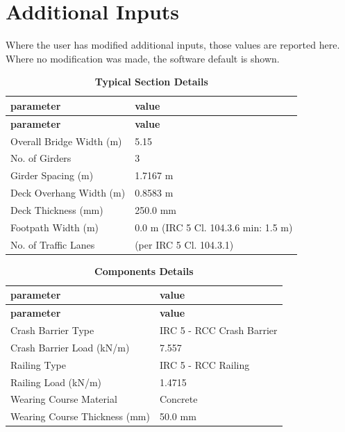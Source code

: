 \documentclass[12pt,a4paper]{report}
\numberwithin{table}{chapter}
\numberwithin{figure}{chapter}
\begin{document}
\newpage
\section{Additional Inputs}
\label{sec:additional-inputs}

Where the user has modified additional inputs, those values are reported here. Where no modification was made, the software default is shown.

\vspace{0.8cm}

\begin{longtable}{|L{5.5cm}|p{10.0cm}|}
\caption{\textbf{Typical Section Details}}
\hline
\textbf{parameter} & \textbf{value} \\
\hline
\endfirsthead

\hline
\textbf{parameter} & \textbf{value} \\
\hline
\endhead
\textnormal{Overall Bridge Width (m)} & 5.15 \\[6pt]
\hline
\textnormal{No. of Girders} & 3 \\[6pt]
\hline
\textnormal{Girder Spacing (m)} & 1.7167 m \\[6pt]
\hline
\textnormal{Deck Overhang Width (m)} & 0.8583 m \\[6pt]
\hline
\textnormal{Deck Thickness (mm)} & 250.0 mm \\[6pt]
\hline
\textnormal{Footpath Width (m)} & 0.0 m (IRC 5 Cl. 104.3.6 min: 1.5 m) \\[6pt]
\hline
\textnormal{No. of Traffic Lanes} &  (per IRC 5 Cl. 104.3.1) \\[6pt]
\hline
\end{longtable}

\vspace{0.8em}

\begin{longtable}{|L{5.5cm}|p{10.0cm}|}
\caption{\textbf{Components Details}}
\hline
\textbf{parameter} & \textbf{value} \\
\hline
\endfirsthead

\hline
\textbf{parameter} & \textbf{value} \\
\hline
\endhead
\textnormal{Crash Barrier Type} & IRC 5 - RCC Crash Barrier \\[6pt]
\hline
\textnormal{Crash Barrier Load (kN/m)} & 7.557 \\[6pt]
\hline

\textnormal{Railing Type} & IRC 5 - RCC Railing \\[6pt]
\hline
\textnormal{Railing Load (kN/m)} & 1.4715 \\[6pt]
\hline
\textnormal{Wearing Course Material} & Concrete \\[6pt]
\hline
\textnormal{Wearing Course Thickness (mm)} & 50.0 mm \\[6pt]
\hline
\end{longtable}
\end{document}
